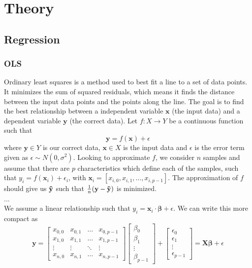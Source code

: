 \documentclass{article}
\theoremstyle{definition}
\begin{document}
\newpage

\section{Theory}
\subsection{Regression}

\subsubsection{OLS}
Ordinary least squares is a method used to best fit a line to a set of data points. It minimizes the sum of squared residuals, which means it finds the distance between the input data points and the points along the line. The goal is to find the best relationship between a independent variable $\mathbf{x}$ (the input data) and a dependent variable $\mathbf{y}$ (the correct data).
Let $f: X \rightarrow Y$ be a continuous function such that
\begin{equation*}
    \mathbf{y} = f(\mathbf{x}) + \epsilon
\end{equation*}
where $\mathbf{y} \in Y$ is our correct data, $\mathbf{x} \in X$ is the input data and $\epsilon$ is the error term given as $\epsilon \sim N(0,\sigma^2)$. Looking to approximate $f$, we consider $n$ samples and assume that there are $p$ characteristics which define each of the samples, such that $y_i = f(\mathbf{x}_i) + \epsilon_i$, with $\mathbf{x}_i = [x_{i,0},x_{i,1},...,x_{i,p-1}]$. The approximation of $f$ should give us $\mathbf{\Tilde{y}}$ such that $\tfrac{1}{n}(\mathbf{y} - \mathbf{\Tilde{y}})$ is minimized. \\
... \\
We assume a linear relationship such that $y_i = \mathbf{x}_i \cdot \bm{\beta} + \epsilon$. We can write this more compact as
\begin{equation*}
    \mathbf{y} =
    \begin{bmatrix}
        x_{0,0} & x_{0,1} & \ldots & x_{0, p-1} \\
        x_{1,0} & x_{1,1} & \ldots & x_{1, p-1} \\
        \vdots & \vdots & \ddots & \vdots \\
        x_{n,0} & x_{n,1} & \ldots & x_{n, p-1}
    \end{bmatrix}
    \begin{bmatrix}
        \beta_0 \\
        \beta_1 \\
        \vdots \\
        \beta_{p-1}
    \end{bmatrix}
    +
    \begin{bmatrix}
        \epsilon_0 \\
        \epsilon_1 \\
        \vdots \\
        \epsilon_{p-1}
    \end{bmatrix}
    = \mathbf{X}\bm{\beta} + \epsilon
\end{equation*}
\end{document}
